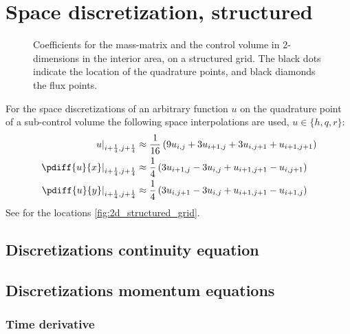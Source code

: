 \section{Space discretization, structured}
\begin{figure}[H]
    \begin{center}
        \def\svgwidth{0.80\textwidth} %
        \resizebox{0.65\textwidth}{!}{
            
        }
    \end{center}
    \caption[Definition of the grid to solve the 2D-shallow water equations in the interior area]{Coefficients for the mass-matrix and the control volume in 2-dimensions in the interior area, on a structured grid. The black dots indicate the location of the quadrature points, and black diamonds the flux points.}
    \label{fig:2d_structured_grid}
\end{figure}
For the space discretizations of an arbitrary function $u$ on the quadrature point of a sub-control volume the following space interpolations are used, $u \in \{h,q,r\}$:
\begin{align}
    \left. u\right|_{i+\quart, j+\quart} & \approx \frac{1}{16}\left( 9u_{i, j} + 3 u_{i+1,j}  + 3  u_{i, j+1} + u_{i+1, j+1}\right)
    \\
    \left. \pdiff{u}{x}\right|_{i+\quart, j+\quart} & \approx \quart \left( 3 u_{i+1,j} - 3 u_{i,j} + u_{i+1, j+1} - u_{i, j+1} \right)
    \\
    \left. \pdiff{u}{y}\right|_{i+\quart, j+\quart} & \approx \quart \left( 3 u_{i, j+1} - 3 u_{i, j} + u_{i+1, j+1} - u_{i+1, j}\right)
\end{align}
See for the locations \autoref{fig:2d_structured_grid}.
\subsection{Discretizations continuity equation}
\subsection{Discretizations momentum equations}
\subsubsection{Time derivative}
\notyet
